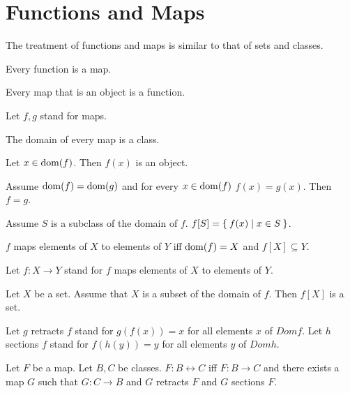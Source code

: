 \documentclass[11pt]{article}
\begin{document}
\section{Functions and Maps}

The treatment of functions and maps is similar to that
of sets and classes.

\begin{forthel}
  \begin{lemma}
    Every function is a map.
  \end{lemma}

  \begin{lemma}
    Every map that is an object is a function.
  \end{lemma}

  Let $f, g$ stand for maps.

  \begin{lemma}
    The domain of every map is a class.
  \end{lemma}

  \begin{lemma}
    Let $x \in \operatorname{dom}(f)$.
    Then $f(x)$ is an object.
  \end{lemma}

  \begin{lemma}
    Assume $\operatorname{dom}(f) = \operatorname{dom}(g)$ and for every $x \in \operatorname{dom}(f)$ $f(x) = g(x)$.
    Then $f = g$.
  \end{lemma}

  \begin{definition}
    Assume $S$ is a subclass of the domain of $f$.
    $f[S] = \Set{f(x) | x \in S}$.
  \end{definition}

  \begin{definition}
    $f$ maps elements of $X$ to elements of $Y$ iff $\operatorname{dom} (f) = X$ and $f[X]
    \subseteq Y$.
  \end{definition}

  Let $f : X \rightarrow Y$ stand for $f$ maps elements of $X$ to elements of
  $Y$.

  \begin{axiom}
    Let $X$ be a set.
    Assume that $X$ is a subset of the domain of $f$.
    Then $f[X]$ is a set.
  \end{axiom}

  Let $g$ retracts $f$ stand for $g(f(x)) = x$ for all elements $x$ of $Dom f$.
  Let $h$ sections $f$ stand for $f(h(y)) = y$ for all elements $y$ of $Dom h$.

  \begin{definition}
    Let $F$ be a map.
    Let $B, C$ be classes.
    $F : B\leftrightarrow C$ iff $F : B\rightarrow C$ and there exists a map $G$
    such that $G : C\rightarrow B$ and $G$ retracts $F$ and $G$ sections $F$.
  \end{definition}
\end{forthel}
\end{document}
